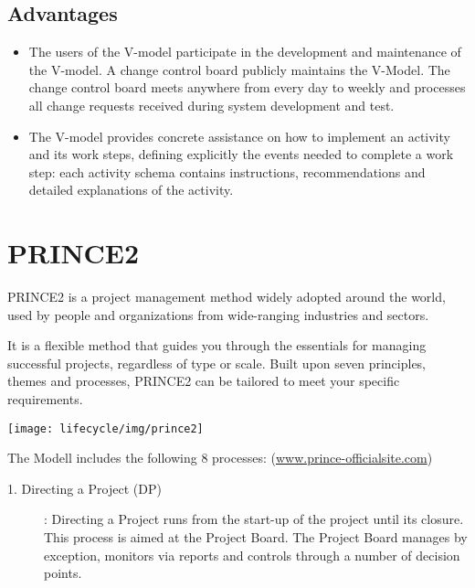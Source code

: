 \begin{minipage}[t]{0.5\linewidth}
\subsection{Advantages}
\begin{itemize}
\item The users of the V-model participate in the development and
maintenance of the V-model. A change control board publicly maintains
the V-Model. The change control board meets anywhere from every day to
weekly and processes all change requests received during system development
and test.
\item The V-model provides concrete assistance on how to implement an
activity and its work steps, defining explicitly the events needed to
complete a work step: each activity schema contains instructions,
recommendations and detailed explanations of the activity.
\end{itemize}

\newpage
\section{PRINCE2}
PRINCE2 is a project management method widely adopted around the world,
used by people and organizations from wide-ranging industries and sectors.

It is a flexible method that guides you through the essentials for
managing successful projects, regardless of type or scale. Built
upon seven principles, themes and processes, PRINCE2 can be tailored
to meet your specific requirements.

\texttt{[image: lifecycle/img/prince2]}

\newslide
The Modell includes the following 8 processes:
  (\href{https://www.prince-officialsite.com}{www.prince-officialsite.com})
\begin{description}
\item [1. Directing a Project (DP)]:
Directing a Project runs from the start-up of the project until its
closure. This process is aimed at the Project Board. The Project Board manages
by exception, monitors via reports and controls through a number of decision
points.


\end{description}
\end{minipage}
